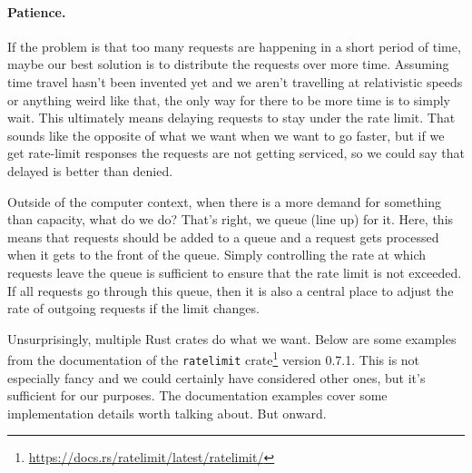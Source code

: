 \paragraph{Patience.}
If the problem is that too many requests are happening in a short period of time, maybe our best solution is to distribute the requests over more time. Assuming time travel hasn't been invented yet and we aren't travelling at relativistic speeds or anything weird like that, the only way for there to be more time is to simply wait. This ultimately means delaying requests to stay under the rate limit. That sounds like the opposite of what we want when we want to go faster, but if we get rate-limit responses the requests are not getting serviced, so we could say that delayed is better than denied.

Outside of the computer context, when there is a more demand for something than capacity, what do we do? That's right, we queue (line up) for it. Here, this means that requests should be added to a queue and a request gets processed when it gets to the front of the queue. Simply controlling the rate at which requests leave the queue is sufficient to ensure that the rate limit is not exceeded. If all requests go through this queue, then it is also a central place to adjust the rate of outgoing requests if the limit changes. 

Unsurprisingly, multiple Rust crates do what we want. Below are some examples from the documentation of the \texttt{ratelimit} crate\footnote{\url{https://docs.rs/ratelimit/latest/ratelimit/}} version 0.7.1. This is not especially fancy and we could certainly have considered other ones, but it's sufficient for our purposes. The documentation examples cover some implementation details worth talking about. But onward.

